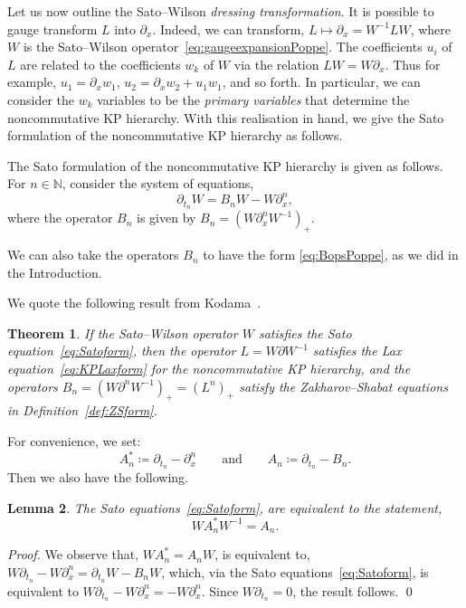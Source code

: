 \documentclass[5p,twocolumn]{elsarticle}
\newcommand*{\pa}{{\partial}}
\newtheorem{theorem}{Theorem}
\newtheorem{lemma}[theorem]{Lemma}
\begin{document}
Let us now outline the Sato--Wilson \emph{dressing transformation}.
It is possible to gauge transform $L$ into $\pa_x$.
Indeed, we can transform, $L\mapsto \pa_x=W^{-1} LW$, where $W$ is the Sato--Wilson operator~\eqref{eq:gaugeexpansionPoppe}. 
The coefficients $u_i$ of $L$ are related to the coefficients $w_k$ of $W$ via the relation $LW=W\pa_x$.
Thus for example, $u_1=\pa_xw_1$, $u_2=\pa_xw_2+u_1w_1$, and so forth.
In particular, we can consider the $w_k$ variables to be the \emph{primary variables} that determine the noncommutative KP hierarchy.
With this realisation in hand, we give the Sato formulation of the noncommutative KP hierarchy as follows.
%
\begin{definition}\label{def:Satoform}
  The Sato formulation of the noncommutative KP hierarchy is given as follows.
  For $n\in\mathbb N$, consider the system of equations, 
  \begin{equation}\label{eq:Satoform}
  \pa_{t_n}W=B_nW-W\pa_x^n,
  \end{equation}
  where the operator $B_n$ is given by $B_n=(W\pa_x^n W^{-1})_+$. 
\end{definition}
%
\begin{remark}
We can also take the operators $B_n$ to have the form \eqref{eq:BopsPoppe}, as we did in the Introduction.
\end{remark}
%
We quote the following result from Kodama~\cite[Th.~2.2]{Kodama}.
%
\begin{theorem}
If the Sato--Wilson operator $W$ satisfies the Sato equation~\eqref{eq:Satoform}, then the operator $L=W\pa W^{-1}$ satisfies the Lax equation~\eqref{eq:KPLaxform}
for the noncommutative KP hierarchy, and the operators $B_n=(W\pa ^nW^{-1})_+=(L^n)_+$ satisfy the Zakharov--Shabat equations in Definition~\ref{def:ZSform}.
\end{theorem}
%
For convenience, we set:
\begin{equation*}
A_n^\ast\coloneqq\pa_{t_n}-\pa_x^n\qquad\text{and}\qquad A_n\coloneqq\pa_{t_n}-B_n.
\end{equation*}
Then we also have the following.
%
\begin{lemma}\label{eq:Satodressing}
The Sato equations~\eqref{eq:Satoform}, are equivalent to the statement, 
\begin{equation*}
WA_n^\ast W^{-1}=A_n. 
\end{equation*}
\end{lemma}
%
\begin{proof}
  We observe that, $WA_n^\ast=A_nW$, is equivalent to, $W\pa_{t_n}-W\pa_x^n=\pa_{t_n}W-B_nW$, which, via the Sato equations~\eqref{eq:Satoform}, is equivalent to $W\pa_{t_n}-W\pa_x^n=-W\pa_x^n$.
  Since $W\pa_{t_n}=0$, the result follows.
\qed
\end{proof}
%
\end{document}
